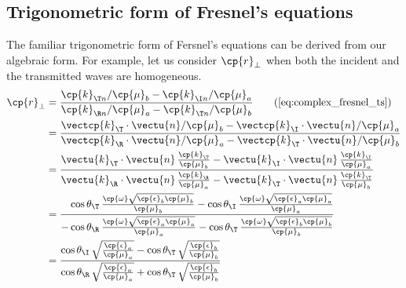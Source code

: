 \begin{refsection}
\subsection{Trigonometric form of Fresnel's equations}
The familiar trigonometric form of Fersnel's equations can be derived from our algebraic form.
For example, let us consider $\cp{r}_\perp$ when both the incident and the transmitted waves are homogeneous.
\begin{subequations}
    \begin{align}
        \cp{r}_\perp 
        &=
        \frac{
            \cp{k}_{\T n} / \cp{\mu}_b - \cp{k}_{\I n} / \cp{\mu}_a
        }{
            \cp{k}_{\R n} / \cp{\mu}_a - \cp{k}_{\T n} / \cp{\mu}_b
        }
        \tag{\ref{eq:complex_fresnel_ts}}
        \\
        &=
        \frac{
            \vectcp{k}_\T \cdot \vectu{n} / \cp{\mu}_b -
            \vectcp{k}_\I \cdot \vectu{n} / \cp{\mu}_a
        }{
            \vectcp{k}_\R \cdot \vectu{n} / \cp{\mu}_a -
            \vectcp{k}_\T \cdot \vectu{n} / \cp{\mu}_b
        }
        \\
        &=
        \frac{
            \vectu{k}_\T \cdot \vectu{n} \, \frac{\cp{k}_\T}{\cp{\mu}_b} -
            \vectu{k}_\I \cdot \vectu{n} \, \frac{\cp{k}_\I}{\cp{\mu}_a}
        }{
            \vectu{k}_\R \cdot \vectu{n} \, \frac{\cp{k}_\R}{\cp{\mu}_a} -
            \vectu{k}_\T \cdot \vectu{n} \, \frac{\cp{k}_\T}{\cp{\mu}_b}
        }
        \\
        &=
        \frac{
            \hphantom{\mathrel{-}}
            \cos\theta_\T \, \frac{\cp{\omega}\sqrt{\cp{\epsilon}_b\cp{\mu}_b}}
                                 {\cp{\mu}_b}
            -
            \cos\theta_\I \, \frac{\cp{\omega}\sqrt{\cp{\epsilon}_a\cp{\mu}_a}}
                                 {\cp{\mu}_a}
        }{
            -
            \cos\theta_\R \, \frac{\cp{\omega}\sqrt{\cp{\epsilon}_a\cp{\mu}_a}}
                                 {\cp{\mu}_a}
            -
            \cos\theta_\T \, \frac{\cp{\omega}\sqrt{\cp{\epsilon}_b\cp{\mu}_b}}
                                 {\cp{\mu}_b}
        }
        \\
        &=
        \frac{
            \cos\theta_\I \, \sqrt{\frac{\cp{\epsilon}_a}{\cp{\mu}_a}}
            -
            \cos\theta_\T \, \sqrt{\frac{\cp{\epsilon}_b}{\cp{\mu}_b}}
        }{
            \cos\theta_\R \, \sqrt{\frac{\cp{\epsilon}_a}{\cp{\mu}_a}}
            +
            \cos\theta_\T \, \sqrt{\frac{\cp{\epsilon}_b}{\cp{\mu}_b}}
}
\end{align}
\end{subequations}
\end{refsection}
